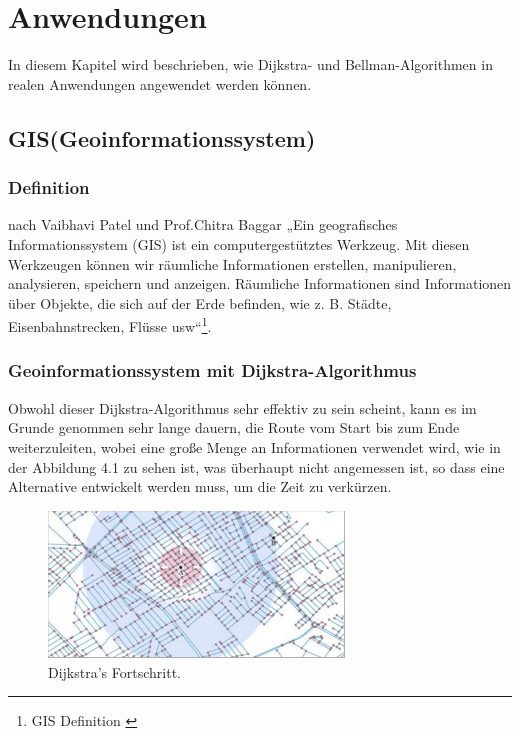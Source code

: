 \chapter{Anwendungen}
\label{Anwendungen}

In diesem Kapitel wird beschrieben, wie Dijkstra- und Bellman-Algorithmen in realen Anwendungen angewendet werden können.


\section{GIS(Geoinformationssystem)}
\label{GIS(Geoinformationssystem)}
\subsection{Definition}


nach Vaibhavi Patel und Prof.Chitra Baggar „Ein geografisches Informationssystem (GIS) ist ein computergestütztes Werkzeug. Mit diesen Werkzeugen können wir räumliche Informationen erstellen, manipulieren, analysieren, speichern und anzeigen. Räumliche Informationen sind Informationen über Objekte, die sich auf der Erde befinden, wie z. B. Städte, Eisenbahnstrecken, Flüsse usw“\footnote{GIS Definition \cite{Vaibhavi2014}}. 

\subsection{Geoinformationssystem mit Dijkstra-Algorithmus}
Obwohl dieser Dijkstra-Algorithmus sehr effektiv zu sein scheint, kann es im Grunde genommen sehr lange dauern, die Route vom Start bis zum Ende weiterzuleiten, wobei eine große Menge an Informationen verwendet wird, wie in der Abbildung 4.1 zu sehen ist, was überhaupt nicht angemessen ist, so dass eine Alternative entwickelt werden muss, um die Zeit zu verkürzen\cite{HamidAli2020}.

\begin{figure}[H]
	\centering
	\includegraphics[width=0.7\textwidth]{images/GIS_red.PNG}
	\caption{\label{fig:GIS_red}Dijkstra's Fortschritt\cite{HamidAli2020}.}
\end{figure}

